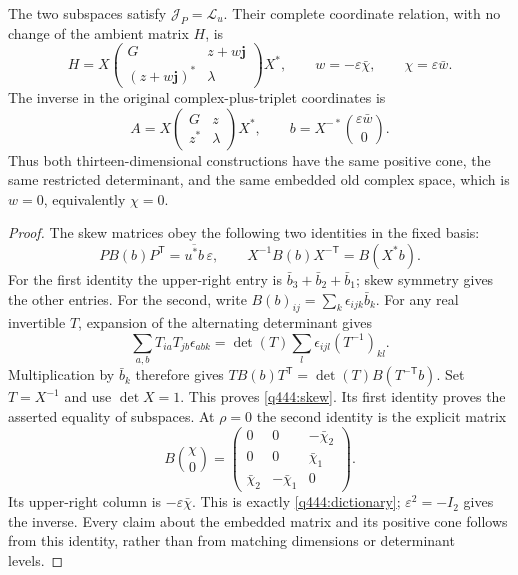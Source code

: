 \begin{theorem}\label{q444:identification}
The two subspaces satisfy $\mathcal J_P=\mathcal L_u$. Their complete
coordinate relation, with no change of the ambient matrix $H$, is
\begin{equation}\label{q444:dictionary}
 H=X\begin{pmatrix}G&z+w\mathbf j\\(z+w\mathbf j)^*&\lambda\end{pmatrix}X^*,
 \qquad w=-\varepsilon\bar\chi,\qquad \chi=\varepsilon\bar w.
\end{equation}
The inverse in the original complex-plus-triplet coordinates is
\[
 A=X\begin{pmatrix}G&z\\z^*&\lambda\end{pmatrix}X^*,
 \qquad b=X^{-*}\binom{\varepsilon\bar w}{0}.
\]
Thus both thirteen-dimensional constructions have the same positive cone,
the same restricted determinant, and the same embedded old complex space,
which is $w=0$, equivalently $\chi=0$.
\end{theorem}
\begin{proof}
The skew matrices obey the following two identities in the fixed basis:
\begin{equation}\label{q444:skew}
 PB(b)P^{\mathsf T}=\overline{u^*b}\,\varepsilon,
 \qquad X^{-1}B(b)X^{-\mathsf T}=B(X^*b).
\end{equation}
For the first identity the upper-right entry is
$\bar b_3+\bar b_2+\bar b_1$; skew symmetry gives the other entries.
For the second, write $B(b)_{ij}=\sum_k\epsilon_{ijk}\bar b_k$.
For any real invertible $T$, expansion of the alternating determinant gives
\[
 \sum_{a,b}T_{ia}T_{jb}\epsilon_{abk}
 =\det(T)\sum_l\epsilon_{ijl}(T^{-1})_{kl}.
\]
Multiplication by $\bar b_k$ therefore gives
$TB(b)T^{\mathsf T}=\det(T)B(T^{-\mathsf T}b)$.
Set $T=X^{-1}$ and use $\det X=1$. This proves \eqref{q444:skew}.
Its first identity proves the asserted equality of subspaces.
At $\rho=0$ the second identity is the explicit matrix
\[
 B\binom{\chi}{0}
 =\begin{pmatrix}0&0&-\bar\chi_2\\
                  0&0&\bar\chi_1\\
                  \bar\chi_2&-\bar\chi_1&0\end{pmatrix}.
\]
Its upper-right column is $-\varepsilon\bar\chi$. This is exactly
\eqref{q444:dictionary}; $\varepsilon^2=-I_2$ gives the inverse. Every
claim about the embedded matrix and its positive cone follows from this
identity, rather than from matching dimensions or determinant levels.
\end{proof}

